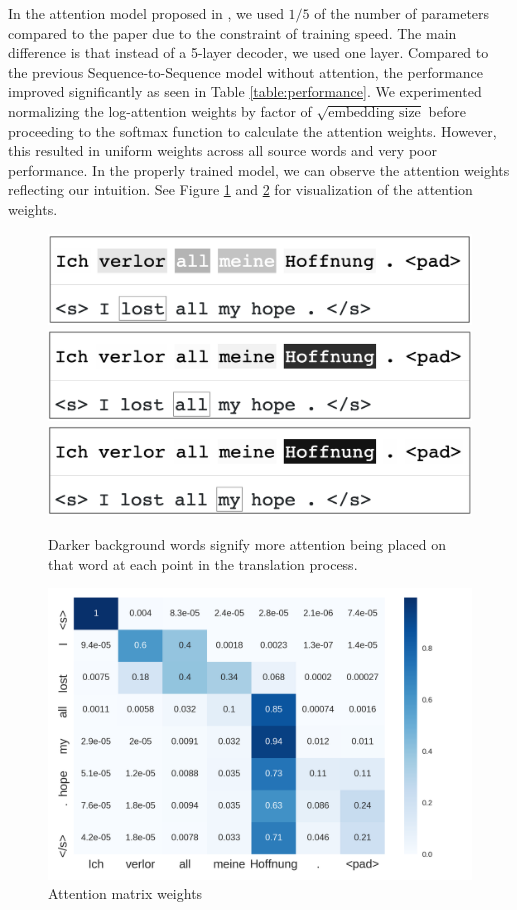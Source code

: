 \documentclass[12pt]{article}
\begin{document}
In the attention model proposed in \cite{vaswani2017attention}, we used $1/5$ of the number of parameters compared to the paper due to the constraint of training speed. The main difference is that instead of a 5-layer decoder, we used one layer. Compared to the previous Sequence-to-Sequence model without attention, the performance improved significantly as seen in Table \ref{table:performance}. We experimented normalizing the log-attention weights by factor of $\sqrt{\textrm{embedding size}}$ before proceeding to the softmax function to calculate the attention weights. However, this resulted in uniform weights across all source words and very poor performance. In the properly trained model, we can observe the attention weights reflecting our intuition. See Figure \ref{fig:word_weights} and \ref{fig:mat_weights} for visualization of the attention weights. 

\begin{figure}
	\centering
	\includegraphics[width=.7\linewidth]{figs/attn1.png}
	\includegraphics[width=.7\linewidth]{figs/attn2.png}
	\includegraphics[width=.7\linewidth]{figs/attn3.png}
	\caption{Darker background words signify more attention being placed on that word at each point in the translation process.}
	\label{fig:word_weights}
\end{figure}

\begin{figure}
	\centering
	\includegraphics[width=.8\linewidth]{figs/attn_mat.png}
	\caption{Attention matrix weights}
	\label{fig:mat_weights}
\end{figure}
\end{document}
